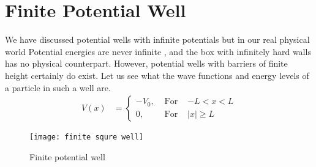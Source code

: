 \section{Finite Potential Well}

We have discussed potential wells with infinite potentials but in our real physical world 
Potential energies are never infinite , and the box with infinitely hard
walls  has no physical counterpart. However, potential wells
with barriers of finite height certainly do exist. Let us see what the wave functions and
energy levels of a particle in such a well are.
\begin{align*}
V(x)&=\left\{\begin{array}{ccc}
-V_{0}, & \text { For } & -L < x< L \\
0, & \text { For } & |x| \geq L
\end{array}\right.
\end{align*}
\begin{figure}[H]
	\centering
	\texttt{[image: finite squre well]}
	\caption{Finite potential well}
	\label{}
\end{figure}


